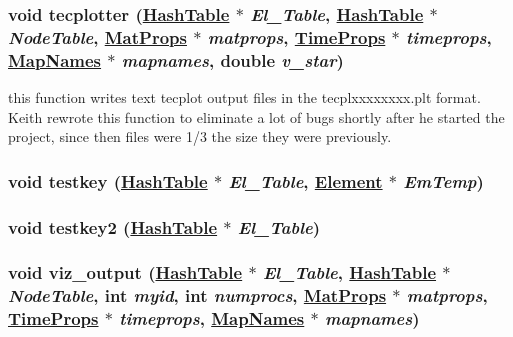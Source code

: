 \hypertarget{tecplot_8C_a11}{
\subsubsection[tecplotter]{\setlength{\rightskip}{0pt plus 5cm}void tecplotter (\hyperlink{classHashTable}{Hash\-Table} $\ast$ {\em El\_\-Table}, \hyperlink{classHashTable}{Hash\-Table} $\ast$ {\em Node\-Table}, \hyperlink{structMatProps}{Mat\-Props} $\ast$ {\em matprops}, \hyperlink{structTimeProps}{Time\-Props} $\ast$ {\em timeprops}, \hyperlink{structMapNames}{Map\-Names} $\ast$ {\em mapnames}, double {\em v\_\-star})}}
\label{tecplot_8C_a11}


this function writes text tecplot output files in the tecplxxxxxxxx.plt format. Keith rewrote this function to eliminate a lot of bugs shortly after he started the project, since then files were 1/3 the size they were previously. 

\hypertarget{tecplot_8C_a9}{
\subsubsection[testkey]{\setlength{\rightskip}{0pt plus 5cm}void testkey (\hyperlink{classHashTable}{Hash\-Table} $\ast$ {\em El\_\-Table}, \hyperlink{classElement}{Element} $\ast$ {\em Em\-Temp})}}
\label{tecplot_8C_a9}


\hypertarget{tecplot_8C_a10}{
\subsubsection[testkey2]{\setlength{\rightskip}{0pt plus 5cm}void testkey2 (\hyperlink{classHashTable}{Hash\-Table} $\ast$ {\em El\_\-Table})}}
\label{tecplot_8C_a10}


\hypertarget{tecplot_8C_a12}{
\subsubsection[viz\_\-output]{\setlength{\rightskip}{0pt plus 5cm}void viz\_\-output (\hyperlink{classHashTable}{Hash\-Table} $\ast$ {\em El\_\-Table}, \hyperlink{classHashTable}{Hash\-Table} $\ast$ {\em Node\-Table}, int {\em myid}, int {\em numprocs}, \hyperlink{structMatProps}{Mat\-Props} $\ast$ {\em matprops}, \hyperlink{structTimeProps}{Time\-Props} $\ast$ {\em timeprops}, \hyperlink{structMapNames}{Map\-Names} $\ast$ {\em mapnames})}}
\label{tecplot_8C_a12}


